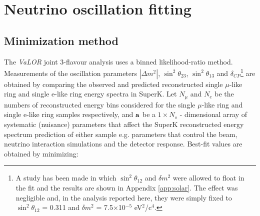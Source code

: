 \clearpage

\section{Neutrino oscillation fitting}
\label{sec:neutrino_oscillation_fitting}


\subsection{Minimization method}

The {\em VaLOR} joint 3-flavour analysis uses a binned likelihood-ratio method.
Measurements of the oscillation parameters
$|\Delta m^{2}|$, $\sin^{2}\theta_{23}$, $\sin^{2}\theta_{13}$ and $\delta_{CP}$\footnote{
   A study has been made in which $\sin^{2}\theta_{12}$ and $\delta m^{2}$ were allowed to float in the fit and 
   the results are shown in Appendix \ref{app:solar}. 
   The effect was negligible and, in the analysis reported here, they were simply fixed to
   $\sin^{2}\theta_{12}$ = 0.311 and $\delta m^{2}$ = 7.5$\times$10$^{-5}$ eV$^{2}$/c$^{4}$.
}
are obtained by comparing the observed and predicted reconstructed single $\mu$-like ring and single e-like ring energy spectra in SuperK. 
Let $N_{\mu}$ and $N_{e}$ be the numbers of reconstructed energy bins considered for the single $\mu$-like ring and
single e-like ring samples respectively, 
and
${\bf a}$ be a $1 \times N_{s}$ - dimensional array of systematic (nuisance) 
parameters that affect the SuperK reconstructed energy spectrum prediction of either sample 
e.g. parameters that control the beam, neutrino interaction simulations and 
the detector response.
Best-fit values are obtained by minimizing: 


